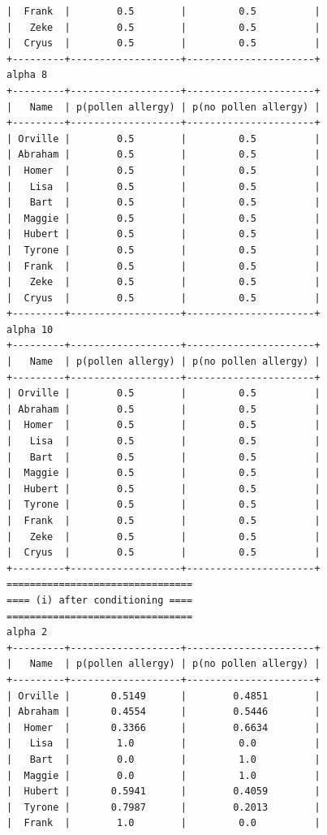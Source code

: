 \documentclass{article}
\begin{document}
\begin{lstlisting}
|  Frank  |        0.5        |         0.5          |
|   Zeke  |        0.5        |         0.5          |
|  Cryus  |        0.5        |         0.5          |
+---------+-------------------+----------------------+
alpha 8
+---------+-------------------+----------------------+
|   Name  | p(pollen allergy) | p(no pollen allergy) |
+---------+-------------------+----------------------+
| Orville |        0.5        |         0.5          |
| Abraham |        0.5        |         0.5          |
|  Homer  |        0.5        |         0.5          |
|   Lisa  |        0.5        |         0.5          |
|   Bart  |        0.5        |         0.5          |
|  Maggie |        0.5        |         0.5          |
|  Hubert |        0.5        |         0.5          |
|  Tyrone |        0.5        |         0.5          |
|  Frank  |        0.5        |         0.5          |
|   Zeke  |        0.5        |         0.5          |
|  Cryus  |        0.5        |         0.5          |
+---------+-------------------+----------------------+
alpha 10
+---------+-------------------+----------------------+
|   Name  | p(pollen allergy) | p(no pollen allergy) |
+---------+-------------------+----------------------+
| Orville |        0.5        |         0.5          |
| Abraham |        0.5        |         0.5          |
|  Homer  |        0.5        |         0.5          |
|   Lisa  |        0.5        |         0.5          |
|   Bart  |        0.5        |         0.5          |
|  Maggie |        0.5        |         0.5          |
|  Hubert |        0.5        |         0.5          |
|  Tyrone |        0.5        |         0.5          |
|  Frank  |        0.5        |         0.5          |
|   Zeke  |        0.5        |         0.5          |
|  Cryus  |        0.5        |         0.5          |
+---------+-------------------+----------------------+
================================
==== (i) after conditioning ====
================================
alpha 2
+---------+-------------------+----------------------+
|   Name  | p(pollen allergy) | p(no pollen allergy) |
+---------+-------------------+----------------------+
| Orville |       0.5149      |        0.4851        |
| Abraham |       0.4554      |        0.5446        |
|  Homer  |       0.3366      |        0.6634        |
|   Lisa  |        1.0        |         0.0          |
|   Bart  |        0.0        |         1.0          |
|  Maggie |        0.0        |         1.0          |
|  Hubert |       0.5941      |        0.4059        |
|  Tyrone |       0.7987      |        0.2013        |
|  Frank  |        1.0        |         0.0          |

\end{lstlisting}
\end{document}

